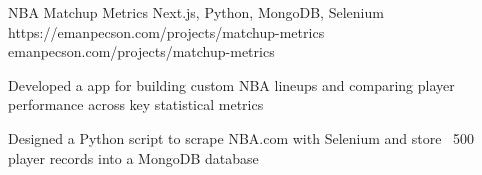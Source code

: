 
\projheader
{NBA Matchup Metrics}
{Next.js, Python, MongoDB, Selenium}
{https://emanpecson.com/projects/matchup-metrics}
{emanpecson.com/projects/matchup-metrics}

\begin{bullets}
	\item Developed a  app for building custom NBA lineups and comparing player performance across key statistical metrics

	\item Designed a Python script to scrape NBA.com with Selenium and store ~500 player records into a MongoDB database
\end{bullets}
